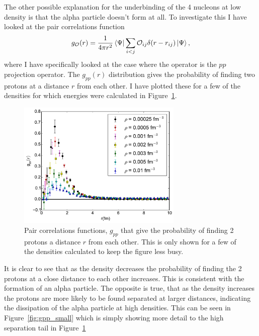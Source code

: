 The other possible explanation for the underbinding of the 4 nucleons at low density is that the alpha particle doesn't form at all. To investigate this I have looked at the pair correlations function
\begin{equation}
   g_\mathcal{O}(r) = \frac{1}{4\pi r^2} \left< \Psi \right|\sum\limits_{i<j}\mathcal{O}_{ij}\delta(r-r_{ij})\left| \Psi \right>,
\end{equation}
where I have specifically looked at the case where the operator is the $pp$ projection operator. The $g_{pp}(r)$ distribution gives the probability of finding two protons at a distance $r$ from each other. I have plotted these for a few of the densities for which energies were calculated in Figure~\ref{fig:gpp}.
\begin{figure}[h!]
   \centering
   \includegraphics[width=0.7\textwidth]{figures/gpp.pdf}
   \caption{Pair correlations functions, $g_{pp}$ that give the probability of finding 2 protons a distance $r$ from each other. This is only shown for a few of the densities calculated to keep the figure less busy.}
   \label{fig:gpp}
\end{figure}
It is clear to see that as the density decreases the probability of finding the 2 protons at a close distance to each other increases. This is consistent with the formation of an alpha particle. The opposite is true, that as the density increases the protons are more likely to be found separated at larger distances, indicating the dissipation of the alpha particle at high densities. This can be seen in Figure~\ref{fig:gpp_small} which is simply showing more detail to the high separation tail in Figure~\ref{fig:gpp}
